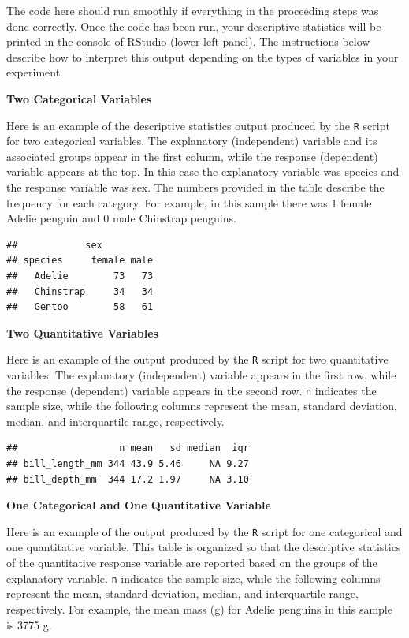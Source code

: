 \documentclass[
]{book}
\begin{document}
The code here should run smoothly if everything in the proceeding steps was done correctly. Once the code has been run, your descriptive statistics will be printed in the console of RStudio (lower left panel). The instructions below describe how to interpret this output depending on the types of variables in your experiment.

\textbf{Two Categorical Variables}

Here is an example of the descriptive statistics output produced by the \texttt{R} script for two categorical variables. The explanatory (independent) variable and its associated groups appear in the first column, while the response (dependent) variable appears at the top. In this case the explanatory variable was species and the response variable was sex. The numbers provided in the table describe the frequency for each category. For example, in this sample there was 1 female Adelie penguin and 0 male Chinstrap penguins.

\begin{verbatim}
##            sex
## species     female male
##   Adelie        73   73
##   Chinstrap     34   34
##   Gentoo        58   61
\end{verbatim}

\textbf{Two Quantitative Variables}

Here is an example of the output produced by the \texttt{R} script for two quantitative variables. The explanatory (independent) variable appears in the first row, while the response (dependent) variable appears in the second row. \texttt{n} indicates the sample size, while the following columns represent the mean, standard deviation, median, and interquartile range, respectively.

\begin{verbatim}
##                  n mean   sd median  iqr
## bill_length_mm 344 43.9 5.46     NA 9.27
## bill_depth_mm  344 17.2 1.97     NA 3.10
\end{verbatim}

\textbf{One Categorical and One Quantitative Variable}

Here is an example of the output produced by the \texttt{R} script for one categorical and one quantitative variable. This table is organized so that the descriptive statistics of the quantitative response variable are reported based on the groups of the explanatory variable. \texttt{n} indicates the sample size, while the following columns represent the mean, standard deviation, median, and interquartile range, respectively. For example, the mean mass (g) for Adelie penguins in this sample is 3775 g.
\end{document}
